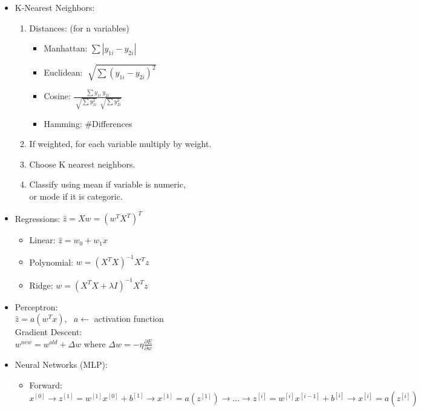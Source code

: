 \documentclass[twocolumn, 10pt]{article}
\begin{document}
\begin{itemize}[leftmargin=*, itemsep=0pt]
    \item K-Nearest Neighbors:
    \begin{enumerate}[topsep=0pt, itemsep=0pt]
        \item Distances: (for n variables)
        \begin{itemize}[topsep=0pt]
            \item Manhattan: $\displaystyle \sum |y_{1i}-y_{2i}|$
            \item Euclidean: $\displaystyle \sqrt[]{\sum (y_{1i}-y_{2i})^2}$
            \item Cosine: $\displaystyle \frac{\sum y_{1i}\ y_{2i}}
            {\sqrt[]{\sum y_{1i}^2}\ \sqrt[]{\sum y_{2i}^2}}$
            \item Hamming: \#Differences
        \end{itemize}
        \item If weighted, for each variable multiply by weight.
        \item Choose K nearest neighbors.
        \item Classify using mean if variable is numeric, \\
        or mode if it is categoric.
    \end{enumerate}

    \item Regressions: \; $\hat{z}=Xw=(w^TX^T)^T$
    \begin{itemize}[topsep=0pt, itemsep=0pt]
        \item Linear: $\hat{z}=w_0+w_1x$
        \item Polynomial: $w=(X^TX)^{-1}X^Tz$
        \item Ridge: $w=(X^TX+\lambda I)^{-1}X^Tz$
    \end{itemize}

    \item Perceptron: \\
    $\hat{z}=a(w^Tx)$, \ $a  \leftarrow$ activation function \\[2pt]
    Gradient Descent: \\
    $w^{new}=w^{old}+\Delta w$ \; where \; 
    $\displaystyle \Delta w=-\eta\frac{\partial E}{\partial w}$

    \item Neural Networks (MLP):
    \begin{itemize}[topsep=0pt, itemsep=0pt]
        \item Forward: $x^{[0]}\rightarrow z^{[1]}=w^{[1]}x^{[0]}+b^{[1]}\rightarrow x^{[1]}=a\left(z^{[1]}\right) \rightarrow \ldots \rightarrow z^{[i]}=w^{[i]}x^{[i-1]}+b^{[i]} \rightarrow x^{[i]}=a\left(z^{[i]}\right)$


\end{itemize}
\end{itemize}
\end{document}
